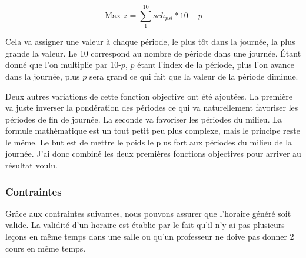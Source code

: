 \begin{equation*}
\text{Max } z = \sum_{1}^{10} sch_{psl} * 10-p
\end{equation*}

Cela va assigner une valeur à chaque période, le plus tôt dans la journée, la plus grande la valeur. Le 10 correspond au nombre de période dans une journée. Étant donné que l'on multiplie par 10-$p$, $p$ étant l'index de la période, plus l'on avance dans la journée, plus $p$ sera grand ce qui fait que la valeur de la période diminue.

Deux autres variations de cette fonction objective ont été ajoutées. La première va juste inverser la pondération des périodes ce qui va naturellement favoriser les périodes de fin de journée. La seconde va favoriser les périodes du milieu. La formule mathématique est un tout petit peu plus complexe, mais le principe reste le même. Le but est de mettre le poids le plus fort aux périodes du milieu de la journée. J'ai donc combiné les deux premières fonctions objectives pour arriver au résultat voulu.

\subsubsection{Contraintes}

Grâce aux contraintes suivantes, nous pouvons assurer que l'horaire généré soit valide. La validité d'un horaire est établie par le fait qu'il n'y ai pas plusieurs leçons en même temps dans une salle ou qu'un professeur ne doive pas donner 2 cours en même temps.

